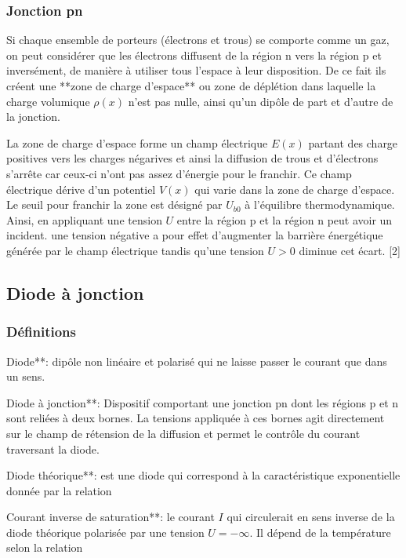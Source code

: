         \subsubsection{Jonction pn}
        Si chaque ensemble de porteurs (électrons et trous) se comporte comme un gaz, on peut considérer que les électrons diffusent de la région n vers la région p et inversément, de manière à utiliser tous l'espace à leur disposition. De ce fait ils créent une **zone de charge d'espace** ou zone de déplétion dans laquelle la charge volumique $\rho(x)$ n'est pas nulle, ainsi qu'un dipôle de part et d'autre de la jonction.

        La zone de charge d'espace forme un champ électrique $E(x)$ partant des charge positives vers les charges négarives et ainsi la diffusion de trous et d'électrons s'arrête car ceux-ci n'ont pas assez d'énergie pour le franchir. Ce champ électrique dérive d'un potentiel $V(x)$ qui varie dans la zone de charge d'espace. Le seuil pour franchir la zone est désigné par $U_{b0}$ à l'équilibre thermodynamique. Ainsi, en appliquant une tension $U$ entre la région p et la région n peut avoir un incident. une tension négative a pour effet d'augmenter la barrière énergétique générée par le champ électrique tandis qu'une tension $U > 0$ diminue cet écart. [2]

        \subsection{Diode à jonction}

        \subsubsection{Définitions}
            \begin{list}
                \item Diode**: dipôle non linéaire et polarisé qui ne laisse passer le courant que dans un sens.
                \item Diode à jonction**: Dispositif comportant une jonction pn dont les régions p et n sont reliées à deux bornes. La tensions appliquée à ces bornes agit directement sur le champ de rétension de la diffusion et permet le contrôle du courant traversant la diode.
                \item Diode théorique**: est une diode qui correspond à la caractéristique exponentielle donnée par la relation 
                \item Courant inverse de saturation**: le courant $I$ qui circulerait en sens inverse de la diode théorique polarisée par une tension $U =-\infty$. Il dépend de la température selon la relation
            \end{list}


